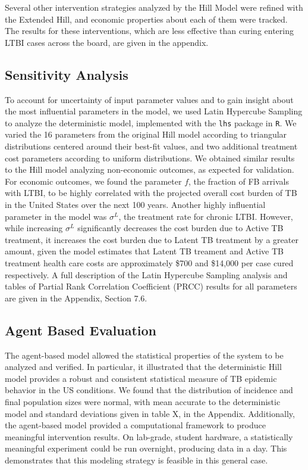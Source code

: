 \documentclass{amsart}
\begin{document}
Several other intervention strategies analyzed by the Hill Model were refined
with the Extended Hill, and economic properties about each of them were tracked.
The results for these interventions, which are less effective than curing
entering LTBI cases across the board, are given in the appendix. 

\subsection{Sensitivity Analysis}
To account for uncertainty of input parameter values and to gain insight about the
most influential parameters in the model, we used Latin Hypercube Sampling to analyze the deterministic model, implemented with the \texttt{lhs} package in \texttt{R}.  We varied 
the 16 parameters from the original Hill model according to triangular distributions centered
around their best-fit values, and two additional treatment cost parameters according to uniform distributions.  We obtained similar results to the Hill model 
analyzing non-economic outcomes, as expected for validation.  For economic 
outcomes, we found the parameter $f$, the fraction of FB arrivals with LTBI,
to be highly correlated with the projected overall cost burden of TB in the United States
over the next 100 years.  Another highly influential parameter in the model was $\sigma^{L}$, 
the treatment rate for chronic LTBI.  However, while increasing $\sigma^{L}$ significantly
decreases the cost burden due to Active TB treatment, it increases the cost burden due to Latent TB treatment by a greater amount, given the model estimates that Latent TB treament and Active
TB treatment health care costs are approximately \$700 and \$14,000 per case cured respectively.  
A full description of the Latin Hypercube Sampling analysis and tables of Partial Rank Correlation Coefficient (PRCC) results for all parameters are given in the Appendix, Section 7.6.  \\

\subsection{Agent Based Evaluation}
The agent-based model allowed the statistical properties of the system to be
analyzed and verified. In particular, it illustrated that the deterministic
Hill model provides a robust and consistent statistical measure of TB epidemic
behavior in the US conditions. We found that the distribution of incidence and
final population sizes were normal, with mean accurate to the deterministic
model and standard deviations given in table X, in the Appendix. Additionally,
the agent-based model provided a computational framework to produce
meaningful intervention results. On lab-grade, student hardware, a statistically
meaningful experiment could be run overnight, producing data in a day. This
demonstrates that this modeling strategy is feasible in this general case.
\end{document}

